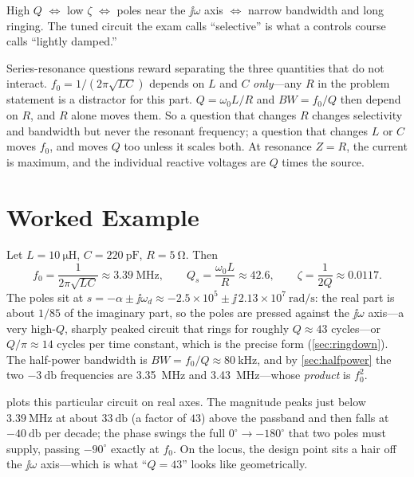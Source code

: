\begin{controlsbox}
High \(Q\) \(\Leftrightarrow\) low \(\zeta\) \(\Leftrightarrow\) poles near the
\(\jj\omega\) axis \(\Leftrightarrow\) narrow bandwidth and long ringing. The tuned
circuit the exam calls ``selective'' is what a controls course calls ``lightly
damped.''
\end{controlsbox}

\begin{exambox}
Series-resonance questions reward separating the three quantities that do not
interact. \(f_0=1/(2\pi\sqrt{LC})\) depends on \(L\) and \(C\) \emph{only}---any
\(R\) in the problem statement is a distractor for this part. \(Q=\omega_0L/R\) and
\(BW=f_0/Q\) then depend on \(R\), and \(R\) alone moves them. So a question
that changes \(R\) changes selectivity and bandwidth but never the resonant
frequency; a question that changes \(L\) or \(C\) moves \(f_0\), and moves \(Q\)
too unless it scales both. At resonance \(Z=R\), the current is maximum, and the
individual reactive voltages are \(Q\) times the source.
\end{exambox}

\section{Worked Example}
Let \(L=\SI{10}{\micro\henry}\), \(C=\SI{220}{\pico\farad}\), \(R=\SI{5}{\ohm}\).
Then
\[
f_0=\frac{1}{2\pi\sqrt{LC}}\approx\SI{3.39}{\mega\hertz},
\qquad
Q_s=\frac{\omega_0 L}{R}\approx 42.6,
\qquad
\zeta=\frac{1}{2Q}\approx0.0117.
\]
The poles sit at \(s=-\alpha\pm\jj\omega_d\approx-2.5\times10^5\pm\jj\,2.13\times10^7\ \si{\radian\per\second}\):
the real part is about \(1/85\) of the imaginary part, so the poles are pressed
against the \(\jj\omega\) axis---a very high-\(Q\), sharply peaked circuit that
rings for roughly \(Q\approx43\) cycles---or \(Q/\pi\approx14\) cycles per time
constant, which is the precise form (\cref{sec:ringdown}). The half-power bandwidth is
\(BW=f_0/Q\approx\SI{80}{\kilo\hertz}\), and by \cref{sec:halfpower} the two
\(-\SI{3}{\decibel}\) frequencies are \SI{3.35}{\mega\hertz} and
\SI{3.43}{\mega\hertz}---whose \emph{product} is \(f_0^2\).

 plots this particular circuit on real axes. The magnitude
peaks just below \(\SI{3.39}{\mega\hertz}\) at about \(\SI{33}{\decibel}\) (a
factor of \(43\)) above the passband and then falls at \(-\SI{40}{\decibel}\) per decade; the
phase swings the full \(0^\circ\to-180^\circ\) that two poles must supply, passing
\(-90^\circ\) exactly at \(f_0\). On the locus, the design point sits a hair off the
\(\jj\omega\) axis---which is what ``\(Q=43\)'' looks like geometrically.

